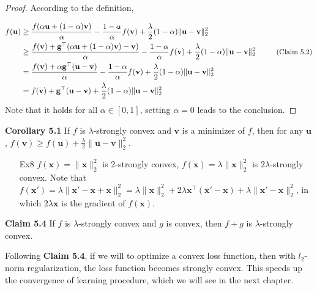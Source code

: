 \documentclass{article}
\newtheorem*{proof}{Proof}
\begin{document}
	\begin{proof} According to the definition,
	
	\begin{equation*}
	\begin{split}
	f(\mathbf{u}) &\geq \frac{f(\alpha\mathbf{u} + (1-\alpha)\mathbf{v})}{\alpha} - \frac{1-\alpha}{\alpha} f(\mathbf{v}) + \frac{\lambda}{2} (1-\alpha) \|\mathbf{u}-\mathbf{v}\|^2_2 \\
	& \geq \frac{f(\mathbf{v}) + \mathbf{g}^\top (\alpha\mathbf{u} + (1-\alpha)\mathbf{v}) - \mathbf{v}) }{\alpha} - \frac{1-\alpha}{\alpha} f(\mathbf{v}) + \frac{\lambda}{2} (1-\alpha) \|\mathbf{u}-\mathbf{v}\|^2_2\ \ \ \ \ \ \ \ \small{\text{(Claim 5.2)}}  \\
	&= \frac{f(\mathbf{v}) + \alpha \mathbf{g}^\top (\mathbf{u} - \mathbf{v}) }{\alpha} - \frac{1-\alpha}{\alpha} f(\mathbf{v}) + \frac{\lambda}{2} (1-\alpha) \|\mathbf{u}-\mathbf{v}\|^2_2 \\
	&= f(\mathbf{v}) + \mathbf{g}^\top (\mathbf{u} - \mathbf{v}) + \frac{\lambda}{2} (1-\alpha) \|\mathbf{u}-\mathbf{v}\|^2_2
	\end{split}
	\end{equation*}
Note that it holds for all $\alpha\in[0,1]$, setting $\alpha=0$ leads to the conclusion.
	\end{proof}

	\textbf{Corollary 5.1} If $f$ is $\lambda$-strongly convex and $\mathbf{v}$ is a minimizer of $f$, then for any $\mathbf{u}$, $f(\mathbf{v})\geq f(\mathbf{u}) +\frac{\lambda}{2}\|\mathbf{u}-\mathbf{v}\|^2_2$.

	\begin{itemize}
	\item[Ex8] $f(\mathbf{x})=\|\mathbf{x}\|^2_2$ is 2-strongly convex, $f(\mathbf{x})=\lambda\|\mathbf{x}\|^2_2$ is $2\lambda$-strongly convex. Note that $f(\mathbf{x}')=\lambda\|\mathbf{x}'-\mathbf{x}+\mathbf{x}\|^2_2 = \lambda\|\mathbf{x}\|^2_2 + 2\lambda \mathbf{x}^\top (\mathbf{x}'-\mathbf{x}) + \lambda\|\mathbf{x}'-\mathbf{x}\|^2_2$, in which $2\lambda \mathbf{x}$ is the gradient of $f(\mathbf{x})$.
	\end{itemize}
	
	\textbf{Claim 5.4} If $f$ is $\lambda$-strongly convex and $g$ is convex, then $f+g$ is $\lambda$-strongly convex.

	Following \textbf{Claim 5.4}, if we will to optimize a convex loss function, then with $l_2$-norm regularization, the loss function becomes strongly convex. This speeds up the convergence of learning procedure, which we will see in the next chapter.
	
\end{document}
